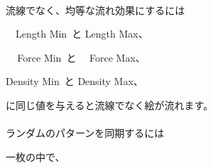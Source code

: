 \documentclass[a4paper,12pt]{article}
\begin{document}
\\
流線でなく、均等な流れ効果にするには\par
\ \ \textquotedbl Length Min\textquotedbl \ と \textquotedbl Length Max\textquotedbl 、\par
\ \,\, \textquotedbl Force Min\textquotedbl \ と \ \, \textquotedbl Force Max\textquotedbl 、\par
\textquotedbl Density Min\textquotedbl \ と \textquotedbl Density Max\textquotedbl 、\par
に同じ値を与えると流線でなく絵が流れます。\\
\\
ランダムのパターンを同期するには\par
一枚の中で、

\newpage

\thispagestyle{empty}
\end{document}
